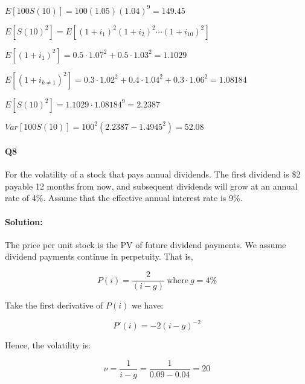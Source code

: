 \documentclass[a4paper, 11pt, twoside]{article}
\begin{document}
$E[100S(10)]=100(1.05)(1.04)^9=149.45$

$E[S(10)^2]=E[(1+i_1)^2(1+i_2)^2\cdots (1+i_{10})^2]$

$E[(1+i_1)^2]=0.5\cdot 1.07^2+0.5\cdot 1.03^2=1.1029$

$E[(1+i_{k\not=1})^2]=0.3\cdot 1.02^2+0.4\cdot 1.04^2+0.3\cdot 1.06^2 = 1.08184$

$E[S(10)^2]=1.1029\cdot 1.08184^9=2.2387$

$Var[100S(10)]=100^2(2.2387-1.4945^2)=52.08$

\paragraph{Q8} For the volatility of a stock that pays annual dividends. The first dividend is \$2 payable 12 months from now, and subsequent dividends will grow at an annual rate of 4\%. Assume that the effective annual interest rate is 9\%.

\paragraph{Solution:} The price per unit stock is the PV of future dividend payments. We assume dividend payments continue in perpetuity. That is,

\[P(i)=\frac{2}{(i-g)}\ \text{where}\ g=4\%\]

Take the first derivative of $P(i)$ we have:

\[P'(i)=-2(i-g)^{-2}\]

Hence, the volatility is:

\[\nu = \frac{1}{i-g}=\frac{1}{0.09-0.04}=20\]
\end{document}
